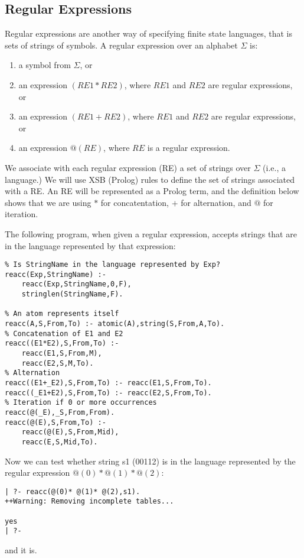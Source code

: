 \subsection{Regular Expressions}

Regular expressions are another way of specifying finite state
languages, that is sets of strings of symbols.  A regular expression
over an alphabet $\Sigma$ is:
\begin{enumerate}
\item
a symbol from $\Sigma$, or
\item
an expression $(RE1*RE2)$, where $RE1$ and $RE2$ are regular expressions, or
\item
an expression $(RE1+RE2)$, where $RE1$ and $RE2$ are regular expressions, or
\item
an expression $@(RE)$, where $RE$ is a regular expression.
\end{enumerate}

We associate with each regular expression (RE) a set of strings over
$\Sigma$ (i.e., a language.)  We will use XSB (Prolog) rules to define
the set of strings associated with a RE.  An RE will be represented as
a Prolog term, and the definition below shows that we are using $*$
for concatentation, $+$ for alternation, and $@$ for iteration.

The following program, when given a regular expression, accepts
strings that are in the language represented by that expression:

\begin{verbatim}
% Is StringName in the language represented by Exp?
reacc(Exp,StringName) :-
    reacc(Exp,StringName,0,F),
    stringlen(StringName,F).

% An atom represents itself
reacc(A,S,From,To) :- atomic(A),string(S,From,A,To).
% Concatenation of E1 and E2 
reacc((E1*E2),S,From,To) :-
    reacc(E1,S,From,M),
    reacc(E2,S,M,To).
% Alternation 
reacc((E1+_E2),S,From,To) :- reacc(E1,S,From,To).
reacc((_E1+E2),S,From,To) :- reacc(E2,S,From,To).
% Iteration if 0 or more occurrences
reacc(@(_E),_S,From,From).
reacc(@(E),S,From,To) :-
    reacc(@(E),S,From,Mid),
    reacc(E,S,Mid,To).
\end{verbatim}

Now we can test whether string s1 (00112) is in the language
represented by the regular expression $@(0)* @(1)* @(2)$:
\begin{verbatim}
| ?- reacc(@(0)* @(1)* @(2),s1).
++Warning: Removing incomplete tables...

yes
| ?- 
\end{verbatim}
and it is.

